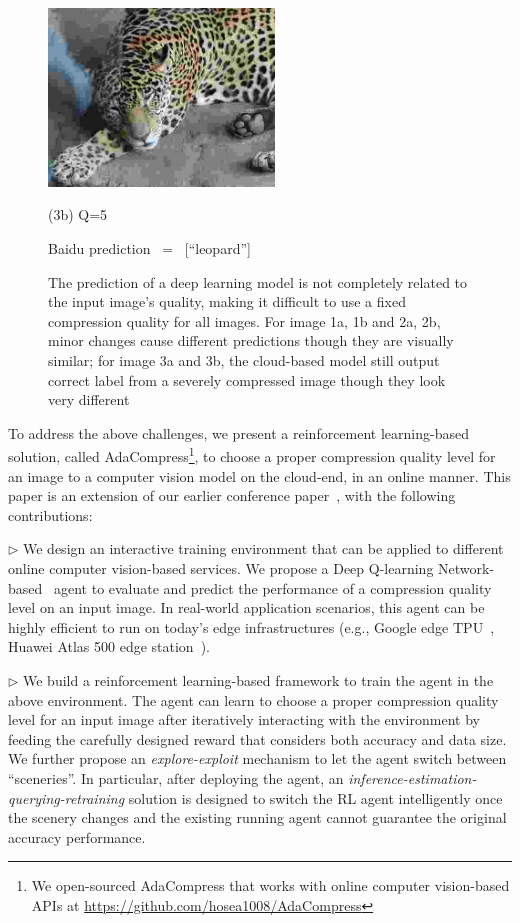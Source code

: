 \begin{figure}[htbp]
\begin{minipage}{0.5\linewidth}
		\centerline{\includegraphics[width=6.0cm, trim=0 0 0 0, clip]{figures/tiger_lowq.jpeg}}
		\centerline{(3b) Q=5}
		\centerline{Baidu prediction \ = \ [``leopard'']}
		\vspace{0.3cm}
	\end{minipage}
	\caption{The prediction of a deep learning model is not completely related to the input image's quality, making it difficult to use a fixed compression quality for all images. For image 1a, 1b and 2a, 2b, minor changes cause different predictions though they are visually similar; for image 3a and 3b, the cloud-based model still output correct label from a severely compressed image though they look very different}
	\label{fig: compress_accuracy}
\end{figure}

To address the above challenges, we present a reinforcement learning-based solution, called AdaCompress\footnote{We open-sourced AdaCompress that works with online computer vision-based APIs at \url{https://github.com/hosea1008/AdaCompress}}, to choose a proper compression quality level for an image to a computer vision model on the cloud-end, in an online manner. This paper is an extension of our earlier conference paper~\cite{2019adacompress}, with the following contributions:

$\rhd$ We design an interactive training environment that can be applied to different online computer vision-based services. We propose a Deep Q-learning Network-based~\cite{DQN} agent to evaluate and predict the performance of a compression quality level on an input image. In real-world application scenarios, this agent can be highly efficient to run on today's edge infrastructures (e.g., Google edge TPU~\cite{google-tpu}, Huawei Atlas 500 edge station~\cite{huawei-atlas500}).
	
$\rhd$ We build a reinforcement learning-based framework to train the agent in the above environment. The agent can learn to choose a proper compression quality level for an input image after iteratively interacting with the environment by feeding the carefully designed reward that considers both accuracy and data size. We further propose an \emph{explore-exploit} mechanism to let the agent switch between ``sceneries''. In particular, after deploying the agent, an \emph{inference-estimation-querying-retraining} solution is designed to switch the RL agent intelligently once the scenery changes and the existing running agent cannot guarantee the original accuracy performance.
	
